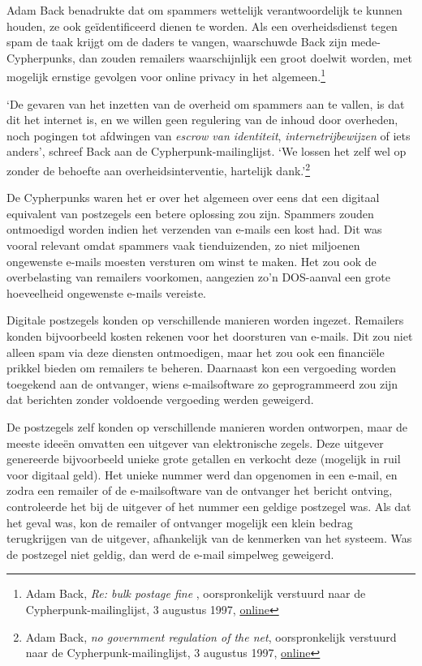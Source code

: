 \documentclass[
  a5paper,
  smalldemyvopaper,11pt,twoside,onecolumn,openright,extrafontsizes,
hidelinks]{memoir}
\begin{document}
Adam Back benadrukte dat om spammers wettelijk verantwoordelijk te
kunnen houden, ze ook geïdentificeerd dienen te worden. Als een
overheidsdienst tegen spam de taak krijgt om de daders te vangen,
waarschuwde Back zijn mede-Cypherpunks, dan zouden remailers
waarschijnlijk een groot doelwit worden, met mogelijk ernstige gevolgen
voor online privacy in het algemeen.\footnote{Adam Back, \emph{Re: bulk
  postage fine }, oorspronkelijk verstuurd naar de
  Cypherpunk-mailinglijst, 3 augustus 1997,
  \href{https://cypherpunks.venona.com/date/1997/08/msg00070.html}{online}}

`De gevaren van het inzetten van de overheid om spammers aan te vallen,
is dat dit het internet is, en we willen geen regulering van de inhoud
door overheden, noch pogingen tot afdwingen van \emph{escrow van
identiteit}, \emph{internetrijbewijzen} of iets anders', schreef Back
aan de Cypherpunk-mailinglijst. `We lossen het zelf wel op zonder de
behoefte aan overheidsinterventie, hartelijk dank.'\footnote{Adam Back,
  \emph{no government regulation of the net}, oorspronkelijk verstuurd
  naar de Cypherpunk-mailinglijst, 3 augustus 1997,
  \href{https://cypherpunks.venona.com/date/1997/08/msg00087.html}{online}}

De Cypherpunks waren het er over het algemeen over eens dat een digitaal
equivalent van postzegels een betere oplossing zou zijn. Spammers zouden
ontmoedigd worden indien het verzenden van e-mails een kost had. Dit was
vooral relevant omdat spammers vaak tienduizenden, zo niet miljoenen
ongewenste e-mails moesten versturen om winst te maken. Het zou ook de
overbelasting van remailers voorkomen, aangezien zo'n DOS-aanval een
grote hoeveelheid ongewenste e-mails vereiste.

Digitale postzegels konden op verschillende manieren worden ingezet.
Remailers konden bijvoorbeeld kosten rekenen voor het doorsturen van
e-mails. Dit zou niet alleen spam via deze diensten ontmoedigen, maar
het zou ook een financiële prikkel bieden om remailers te beheren.
Daarnaast kon een vergoeding worden toegekend aan de ontvanger, wiens
e-mailsoftware zo geprogrammeerd zou zijn dat berichten zonder voldoende
vergoeding werden geweigerd.

De postzegels zelf konden op verschillende manieren worden ontworpen,
maar de meeste ideeën omvatten een uitgever van elektronische zegels.
Deze uitgever genereerde bijvoorbeeld unieke grote getallen en verkocht
deze (mogelijk in ruil voor digitaal geld). Het unieke nummer werd dan
opgenomen in een e-mail, en zodra een remailer of de e-mailsoftware van
de ontvanger het bericht ontving, controleerde het bij de uitgever of
het nummer een geldige postzegel was. Als dat het geval was, kon de
remailer of ontvanger mogelijk een klein bedrag terugkrijgen van de
uitgever, afhankelijk van de kenmerken van het systeem. Was de postzegel
niet geldig, dan werd de e-mail simpelweg geweigerd.
\end{document}
